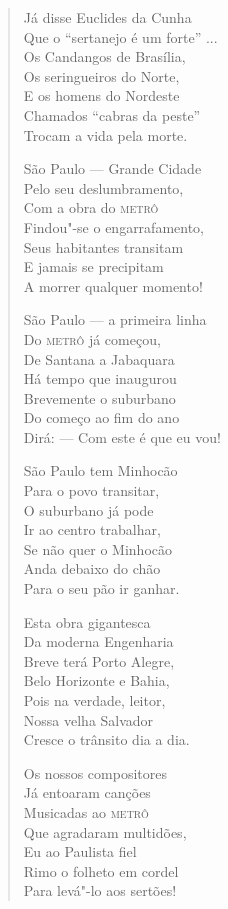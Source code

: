 \begin{verse}
Já disse Euclides da Cunha \\
Que o ``sertanejo é um forte'' ... \\
Os Candangos de Brasília, \\
Os seringueiros do Norte, \\
E os homens do Nordeste \\
Chamados ``cabras da peste'' \\
Trocam a vida pela morte. 

São Paulo ---  Grande Cidade \\
Pelo seu deslumbramento, \\
Com a obra do \textsc{metrô} \\
Findou"-se o engarrafamento, \\
Seus habitantes transitam \\
E jamais se precipitam \\
A morrer qualquer momento! 

São Paulo ---  a primeira linha \\
Do \textsc{metrô} já começou, \\
De Santana a Jabaquara \\
Há tempo que inaugurou \\
Brevemente o suburbano \\
Do começo ao fim do ano \\
Dirá: ---  Com este é que eu vou! 
\pagebreak

São Paulo tem Minhocão \\
Para o povo transitar, \\
O suburbano já pode \\
Ir ao centro trabalhar, \\
Se não quer o Minhocão \\
Anda debaixo do chão \\
Para o seu pão ir ganhar. 

Esta obra gigantesca \\
Da moderna Engenharia \\
Breve terá Porto Alegre, \\
Belo Horizonte e Bahia, \\
Pois na verdade, leitor, \\
Nossa velha Salvador \\
Cresce o trânsito dia a dia. 

Os nossos compositores \\
Já entoaram canções \\
Musicadas ao \textsc{metrô} \\
Que agradaram multidões, \\
Eu ao Paulista fiel \\
Rimo o folheto em cordel \\
Para levá"-lo aos sertões! 


\end{verse}
